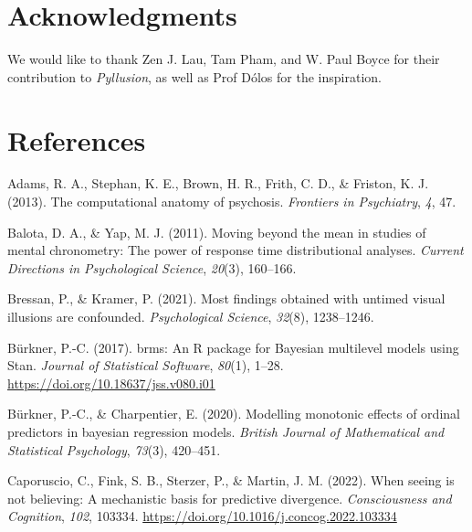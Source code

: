 \documentclass[
  man,floatsintext]{apa6}
\newlength{\cslhangindent}
\newlength{\cslentryspacingunit} %
\newenvironment{CSLReferences}[2] %
 {%
  \setlength{\parindent}{0pt}
  \ifodd #1
  \let\oldpar\par
  \def\par{\hangindent=\cslhangindent\oldpar}
  \fi
  \setlength{\parskip}{#2\cslentryspacingunit}
 }%
 {}
\begin{document}
\hypertarget{acknowledgments}{%
\section{Acknowledgments}\label{acknowledgments}}

We would like to thank Zen J. Lau, Tam Pham, and W. Paul Boyce for their contribution to \emph{Pyllusion}, as well as Prof Dólos for the inspiration.

\newpage

\hypertarget{references}{%
\section{References}\label{references}}

\hypertarget{refs}{}
\begin{CSLReferences}{1}{0}
\leavevmode{}%
Adams, R. A., Stephan, K. E., Brown, H. R., Frith, C. D., \& Friston, K. J. (2013). The computational anatomy of psychosis. \emph{Frontiers in Psychiatry}, \emph{4}, 47.

\leavevmode{}%
Balota, D. A., \& Yap, M. J. (2011). Moving beyond the mean in studies of mental chronometry: The power of response time distributional analyses. \emph{Current Directions in Psychological Science}, \emph{20}(3), 160--166.

\leavevmode{}%
Bressan, P., \& Kramer, P. (2021). Most findings obtained with untimed visual illusions are confounded. \emph{Psychological Science}, \emph{32}(8), 1238--1246.

\leavevmode{}%
Bürkner, P.-C. (2017). {brms}: An {R} package for {Bayesian} multilevel models using {Stan}. \emph{Journal of Statistical Software}, \emph{80}(1), 1--28. \url{https://doi.org/10.18637/jss.v080.i01}

\leavevmode{}%
Bürkner, P.-C., \& Charpentier, E. (2020). Modelling monotonic effects of ordinal predictors in bayesian regression models. \emph{British Journal of Mathematical and Statistical Psychology}, \emph{73}(3), 420--451.

\leavevmode{}%
Caporuscio, C., Fink, S. B., Sterzer, P., \& Martin, J. M. (2022). When seeing is not believing: A mechanistic basis for predictive divergence. \emph{Consciousness and Cognition}, \emph{102}, 103334. \url{https://doi.org/10.1016/j.concog.2022.103334}


\end{CSLReferences}
\end{document}
